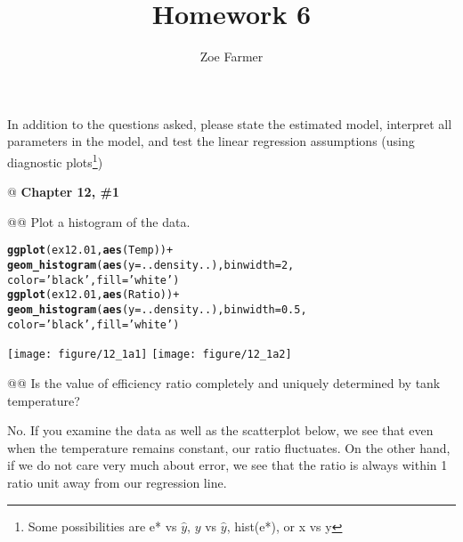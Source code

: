 \documentclass[10pt]{article}\usepackage[]{graphicx}\usepackage[]{xcolor}
\title{Homework 6}
\author{Zoe Farmer}
\makeatletter
\newcommand{\hlnum}[1]{\textcolor[rgb]{0.686,0.059,0.569}{#1} }%
\newcommand{\hlstr}[1]{\textcolor[rgb]{0.192,0.494,0.8}{#1} }%
\newcommand{\hlopt}[1]{\textcolor[rgb]{0,0,0}{#1} }%
\newcommand{\hlstd}[1]{\textcolor[rgb]{0.345,0.345,0.345}{#1} }%
\newcommand{\hlkwc}[1]{\textcolor[rgb]{0.333,0.667,0.333}{#1} }%
\newcommand{\hlkwd}[1]{\textcolor[rgb]{0.737,0.353,0.396}{\textbf{#1} } }%
\newenvironment{kframe}{%
 \def\at@end@of@kframe{}%
 \ifinner\ifhmode%
  \def\at@end@of@kframe{\end{minipage} }%
  \begin{minipage}{\columnwidth}%
 \fi\fi%
 \def\FrameCommand##1{\hskip\@totalleftmargin \hskip-\fboxsep
 \colorbox{shadecolor}{##1}\hskip-\fboxsep
     \hskip-\linewidth \hskip-\@totalleftmargin \hskip\columnwidth}%
 \MakeFramed {\advance\hsize-\width
   \@totalleftmargin\z@ \linewidth\hsize
   \@setminipage} }%
 {\par\unskip\endMakeFramed%
 \at@end@of@kframe}
\newenvironment{knitrout}{}{} %
\makeatother
\begin{document}
\maketitle




In addition to the questions asked, please state the estimated model, interpret all parameters in the model, and test
the linear regression assumptions (using diagnostic plots\footnote{Some possibilities are e* vs $\hat{y}$, $y$ vs
$\hat{y}$, hist(e*), or x vs y})

\begin{easylist}[enumerate]
    @ \textbf{Chapter 12, \#1}  %

    @@ Plot a histogram of the data.

\begin{knitrout}
\color{fgcolor}\begin{kframe}
\begin{alltt}
         \hlkwd{ggplot}\hlstd{(ex12.01,} \hlkwd{aes}\hlstd{(Temp))} \hlopt{+}
             \hlkwd{geom_histogram}\hlstd{(}\hlkwd{aes}\hlstd{(}\hlkwc{y}\hlstd{=..density..),} \hlkwc{binwidth}\hlstd{=}\hlnum{2}\hlstd{,}
                            \hlkwc{color}\hlstd{=}\hlstr{'black'}\hlstd{,} \hlkwc{fill}\hlstd{=}\hlstr{'white'}\hlstd{)}
         \hlkwd{ggplot}\hlstd{(ex12.01,} \hlkwd{aes}\hlstd{(Ratio))} \hlopt{+}
             \hlkwd{geom_histogram}\hlstd{(}\hlkwd{aes}\hlstd{(}\hlkwc{y}\hlstd{=..density..),} \hlkwc{binwidth}\hlstd{=}\hlnum{0.5}\hlstd{,}
                            \hlkwc{color}\hlstd{=}\hlstr{'black'}\hlstd{,} \hlkwc{fill}\hlstd{=}\hlstr{'white'}\hlstd{)}
\end{alltt}
\end{kframe}

{\centering \texttt{[image: figure/12\_1a1]} 
\texttt{[image: figure/12\_1a2]} 

}



\end{knitrout}


    @@ Is the value of efficiency ratio completely and uniquely determined by tank temperature?\newline

    No. If you examine the data as well as the scatterplot below, we see that even when the temperature remains
    constant, our ratio fluctuates. On the other hand, if we do not care very much about error, we see that the ratio is
    always within 1 ratio unit away from our regression line.


\end{easylist}
\end{document}
